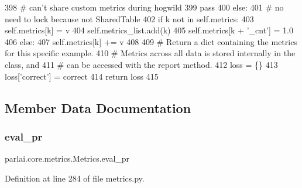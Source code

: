 \begin{DoxyCode}
398                             \textcolor{comment}{# can't share custom metrics during hogwild}
399                             \textcolor{keywordflow}{pass}
400                         \textcolor{keywordflow}{else}:
401                             \textcolor{comment}{# no need to lock because not SharedTable}
402                             \textcolor{keywordflow}{if} k \textcolor{keywordflow}{not} \textcolor{keywordflow}{in} self.metrics:
403                                 self.metrics[k] = v
404                                 self.metrics\_list.add(k)
405                                 self.metrics[k + \textcolor{stringliteral}{'\_cnt'}] = 1.0
406                             \textcolor{keywordflow}{else}:
407                                 self.metrics[k] += v
408 
409         \textcolor{comment}{# Return a dict containing the metrics for this specific example.}
410         \textcolor{comment}{# Metrics across all data is stored internally in the class, and}
411         \textcolor{comment}{# can be accessed with the report method.}
412         loss = \{\}
413         loss[\textcolor{stringliteral}{'correct'}] = correct
414         \textcolor{keywordflow}{return} loss
415 
\end{DoxyCode}


\subsection{Member Data Documentation}
\mbox{\label{classparlai_1_1core_1_1metrics_1_1Metrics_a6bf169112945fa8e28547e8c4464b5d6}} 
\subsubsection{\texorpdfstring{eval\+\_\+pr}{eval\_pr}}
{\footnotesize\ttfamily parlai.\+core.\+metrics.\+Metrics.\+eval\+\_\+pr}



Definition at line 284 of file metrics.\+py.

\mbox{\label{classparlai_1_1core_1_1metrics_1_1Metrics_a8075a929d40c06f5bbae755b98126c71}} 
